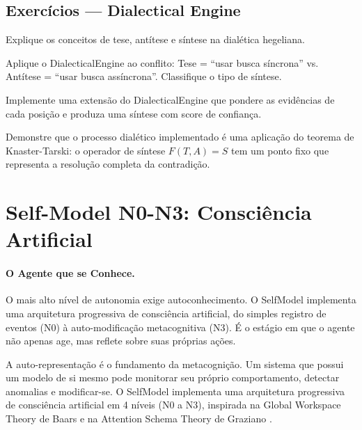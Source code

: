 \subsection{Exercícios — Dialectical Engine}
\begin{exercicio}
Explique os conceitos de tese, antítese e síntese na dialética
hegeliana.
\end{exercicio}
\begin{exercicio}
Aplique o DialecticalEngine ao conflito: Tese = ``usar busca
síncrona'' vs. Antítese = ``usar busca assíncrona''. Classifique o
tipo de síntese.
\end{exercicio}
\begin{exercicio}
Implemente uma extensão do DialecticalEngine que pondere as evidências
de cada posição e produza uma síntese com score de confiança.
\end{exercicio}
\begin{exercicio}
Demonstre que o processo dialético implementado é uma aplicação do
teorema de Knaster-Tarski: o operador de síntese $F(T, A) = S$ tem
um ponto fixo que representa a resolução completa da contradição.
\end{exercicio}

\section{Self-Model N0-N3: Consciência Artificial}
\label{sec:self-model}
\label{sec:niveis-autonomia}
\nivelphd

\paragraph{O Agente que se Conhece.}
O mais alto nível de autonomia exige autoconhecimento.
O SelfModel implementa uma arquitetura progressiva de
consciência artificial, do simples registro de eventos (N0)
à auto-modificação metacognitiva (N3). É o estágio em que
o agente não apenas age, mas reflete sobre suas próprias ações.

A auto-representação é o fundamento da metacognição. Um sistema que
possui um modelo de si mesmo pode monitorar seu próprio comportamento,
detectar anomalias e modificar-se. O SelfModel implementa uma
arquitetura progressiva de consciência artificial em 4 níveis (N0 a
N3), inspirada na Global Workspace Theory de Baars e na Attention
Schema Theory de Graziano \cite{metzinger2020minimal,
opencode2026spec036}.

